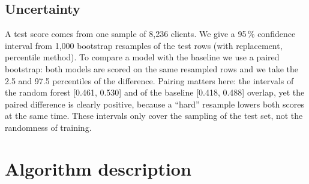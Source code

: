 \documentclass[11pt,a4paper]{article}
\begin{document}
\subsection{Uncertainty}
A test score comes from one sample of 8,236 clients. We give a 95\,\% confidence interval from 1,000 bootstrap
resamples of the test rows (with replacement, percentile method). To compare a model with the baseline we use a
paired bootstrap: both models are scored on the same resampled rows and we take the 2.5 and 97.5 percentiles of the
difference. Pairing matters here: the intervals of the random forest [0.461, 0.530] and of the baseline [0.418,
0.488] overlap, yet the paired difference is clearly positive, because a ``hard'' resample lowers both scores at the
same time. These intervals only cover the sampling of the test set, not the randomness of training.

\section{Algorithm description}
\end{document}

